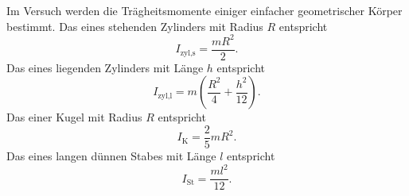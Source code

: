 Im Versuch werden die Trägheitsmomente einiger einfacher geometrischer Körper bestimmt.
Das eines stehenden Zylinders mit Radius $R$ entspricht
\begin{equation}
    I_\text{zyl,s} = \frac{m R^2}{2}.
    \label{eqn:zyls}
\end{equation}
Das eines liegenden Zylinders mit Länge $h$ entspricht
\begin{equation}
    I_\text{zyl,l} = m \left ( \frac{R^2}{4} + \frac{h^2}{12} \right ).
    \label{eqn:zyll}
\end{equation}
Das einer Kugel mit Radius $R$ entspricht
\begin{equation}
    I_\text{K} = \frac{2}{5}mR^2 .
    \label{eqn:kugel}
\end{equation}
Das eines langen dünnen Stabes mit Länge $l$ entspricht
\begin{equation}
    I_\text{St} = \frac{ml^2}{12} .
    \label{eqn:stab}
\end{equation}

